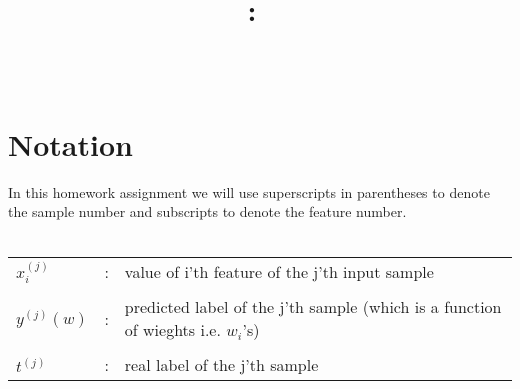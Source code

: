 \documentclass{article}
\title{
	\vspace{2in}
	\textmd{\textbf{\hmwkClass:\ \hmwkTitle}}\\
	\vspace{0.1in}\large{\institute}\\
	\vspace{3in}
}
\author{\hmwkAuthorName}
\date{}
\begin{document}
	
	\maketitle
	\pagebreak %
	\tableofcontents
	\pagebreak
	
	\section{Notation}
	In this homework assignment we will use superscripts in parentheses to denote the sample number and subscripts to denote the feature number.\\\\

		\begin{tabular}{l c l}
			$x_i^{(j)}$  &:&value of i'th feature of the j'th input sample\\\\
			$y^{(j)}(w)$  &:&predicted label of the j'th sample (which is a function of wieghts i.e. $w_i$'s)\\\\
			$t^{(j)}$  &:&real label of the j'th sample
		\end{tabular}
	 	 
	\pagebreak
	
\end{document}

